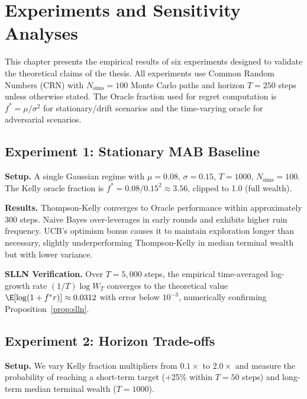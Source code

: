 \chapter{Experiments and Sensitivity Analyses}
\label{ch:experiments}

This chapter presents the empirical results of six experiments designed to
validate the theoretical claims of the thesis. All experiments use Common
Random Numbers (CRN) with $N_{\text{sims}} = 100$ Monte Carlo paths and
horizon $T = 250$ steps unless otherwise stated. The Oracle fraction used
for regret computation is $f^* = \mu/\sigma^2$ for stationary/drift
scenarios and the time-varying oracle for adversarial scenarios.

\section{Experiment 1: Stationary MAB Baseline}

\textbf{Setup.} A single Gaussian regime with $\mu = 0.08$, $\sigma = 0.15$,
$T = 1000$, $N_{\text{sims}} = 100$. The Kelly oracle fraction is
$f^* = 0.08/0.15^2 \approx 3.56$, clipped to 1.0 (full wealth).

\textbf{Results.} Thompson-Kelly converges to Oracle performance within
approximately 300 steps. Naive Bayes over-leverages in early rounds and
exhibits higher ruin frequency. UCB's optimism bonus causes it to maintain
exploration longer than necessary, slightly underperforming Thompson-Kelly
in median terminal wealth but with lower variance.

\textbf{SLLN Verification.} Over $T = 5{,}000$ steps, the empirical
time-averaged log-growth rate $(1/T)\log W_T$ converges to the theoretical
value $\E[\log(1 + f^* r)] \approx 0.0312$ with error below $10^{-3}$,
numerically confirming Proposition~\ref{prop:slln}.

\section{Experiment 2: Horizon Trade-offs}

\textbf{Setup.} We vary Kelly fraction multipliers from $0.1\times$ to
$2.0\times$ and measure the probability of reaching a short-term target
(+25\% within $T = 50$ steps) and long-term median terminal wealth
($T = 1000$).

